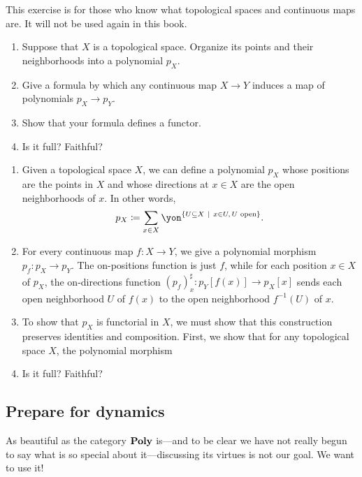 \documentclass[Book-Poly]{subfiles}
\begin{document}
\begin{exercise}
This exercise is for those who know what topological spaces and continuous maps are. It will not be used again in this book.
\begin{enumerate}
	\item Suppose that $X$ is a topological space. Organize its points and their neighborhoods into a polynomial $p_X$.
	\item Give a formula by which any continuous map $X\to Y$ induces a map of polynomials $p_X\to p_Y$.
	\item Show that your formula defines a functor.
	\item Is it full? Faithful?
\qedhere
\end{enumerate}
\begin{solution}
\begin{enumerate}
	\item Given a topological space $X$, we can define a polynomial $p_X$ whose positions are the points in $X$ and whose directions at $x \in X$ are the open neighborhoods of $x$.
	In other words,
	\[
	    p_X \coloneqq \sum_{x \in X} \yon^{\{ U \subseteq X \ | \ x \in U, \, U \text{ open} \}}.
	\]
	\item For every continuous map $f \colon X \to Y$, we give a polynomial morphism $p_f \colon p_X \to p_Y$.
	The on-positions function is just $f$, while for each position $x \in X$ of $p_X$, the on-directions function $(p_f)^\sharp_x \colon p_Y[f(x)] \to p_X[x]$ sends each open neighborhood $U$ of $f(x)$ to the open neighborhood $f^{-1}(U)$ of $x$.
	
	\item To show that $p_X$ is functorial in $X$, we must show that this construction preserves identities and composition.
	First, we show that for any topological space $X$, the polynomial morphism 
	
	\item Is it full? Faithful?
\end{enumerate}
\end{solution}
\end{exercise}


\subsection{Prepare for dynamics}\label{subsec_prepare_dyn}

As beautiful as the category $\textbf{Poly}$ is---and to be clear we have not really begun to say what is so special about it---discussing its virtues is not our goal. We want to use it!
\end{document}
